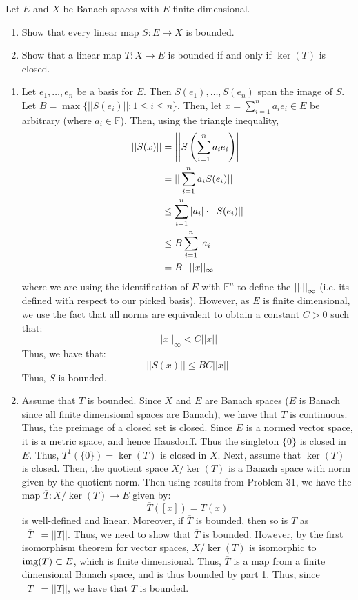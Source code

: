 \documentclass[12pt]{article}
\begin{document}
\begin{problem}{33}
    Let $E$ and $X$ be Banach spaces with $E$ finite dimensional. 
    \begin{enumerate}
        \item Show that every linear map $S: E \to X$ is bounded. 
        \item Show that a linear map $T: X \to E$ is bounded if and only if $\ker(T)$ is closed. 
    \end{enumerate}
\end{problem}
\begin{solution} 
    \bbni
    \begin{enumerate}
        \item Let $e_1, \ldots, e_n$ be a basis for $E$. Then $S(e_1), \ldots, S(e_n)$ span the image of $S$. Let $B = \max\{ ||S(e_i)|| : 1 \leq i \leq n\}$. Then, let $x = \sum_{i = 1}^n a_ie_i \in E$ be arbitrary (where $a_i \in \mathbb F$). Then, using the triangle inequality, 
        \begin{align*}
            ||S(x)|| &= \left\vert\left\vert S\left(\sum_{i = 1}^n a_ie_i\right)\right\vert\right\vert \\
            &= ||\sum_{i = 1}^n a_i S(e_i)|| \\
            &\leq \sum_{i = 1}^n |a_i| \cdot ||S(e_i)|| \\
            &\leq B \sum_{i = 1}^n |a_i|\\
            &= B \cdot ||x||_\infty
        \end{align*} 
        where we are using the identification of $E$ with $\mathbb{F}^n$ to define the $\left\vert\left\vert\cdot\right\vert\right\vert_\infty$ (i.e. its defined with respect to our picked basis). However, as $E$ is finite dimensional, we use the fact that all norms are equivalent to obtain a constant $C > 0$ such that: 
        \[ ||x||_\infty < C||x|| \]
        Thus, we have that: 
        \[ ||S(x)|| \leq BC ||x||\]
        Thus, $S$ is bounded.
        \item Assume that $T$ is bounded. Since $X$ and $E$ are Banach spaces ($E$ is Banach since all finite dimensional spaces are Banach), we have that $T$ is continuous. Thus, the preimage of a closed set is closed. Since $E$ is a normed vector space, it is a metric space, and hence Hausdorff. Thus the singleton $\{0\}$ is closed in $E$. Thus, $T^{1}(\{0\}) = \ker(T)$ is closed in $X$. \bbni
        Next, assume that $\ker(T)$ is closed. Then, the quotient space $X/\ker(T)$ is a Banach space with norm given by the quotient norm. Then using results from Problem 31, we have the map $\overline{T}: X/\ker(T) \to E$ given by:
        \[ \overline{T}([x]) = T(x)\]
        is well-defined and linear. Moreover, if $\overline{T}$ is bounded, then so is $T$ as $||\overline{T}|| = ||T||$. Thus, we need to show that $\overline{T}$ is bounded. \bbni
        However, by the first isomorphism theorem for vector spaces, $X/\ker(T)$ is isomorphic to $\operatorname{img}(T) \subset E$, which is finite dimensional. Thus, $\overline{T}$ is a map from a finite dimensional Banach space, and is thus bounded by part 1. Thus, since $||\overline{T}|| = ||T||$, we have that $T$ is bounded.     \end{enumerate}
\end{solution}
\newpage 
\end{document}
